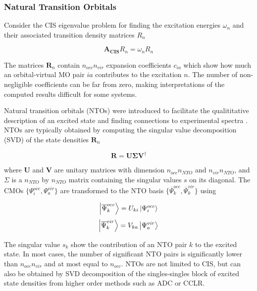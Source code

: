 \subsubsection{Natural Transition Orbitals}

Consider the CIS eigenvalue problem for finding the excitation energies $\omega_n$ and their associated transition density matrices $R_n$

\begin{equation}
\mathbf{A_{CIS}} R_n = \omega_n R_n 
\end{equation}

The matrices $\mathbf{R}_n$ contain $n_{occ}n_{vir}$ expansion coefficients $c_{ia}$ which show how much an orbital-virtual MO pair $ia$ contributes to the excitation $n$. The number of non-negligible coefficients can be far from zero, making interpretations of the computed results difficult for some systems.

Natural transition orbitals (NTOs) were introduced to facilitate the qualititative description of an excited state and finding connections to experimental spectra \cite{Luz1976, Mar2003, Mar2008}. NTOs are typically obtained by computing the singular value decomposition (SVD) of the state densities $\mathbf{R}_n$

\begin{equation}
\mathbf{R} = \mathbf{U} \mathbf{\Sigma} \mathbf{V}^{\dagger}  
\end{equation} 

\noindent where $\mathbf{U}$ and $\mathbf{V}$ are unitary matrices with dimension $n_{occ} n_{NTO}$ and $n_{vir}n_{NTO}$, and $\Sigma$ is a $n_{NTO}$ by $n_{NTO}$ matrix containing the singular values $s$ on its diagonal. The CMOs $\{\Psi^{occ}_i,\Psi^{vir}_a\}$ are transformed to the NTO basis $\{\overline{\Psi}^{occ}_k,\overline{\Psi}^{vir}_k\}$ using

\begin{equation}
\ket{\overline{\Psi}^{occ}_k} = U_{ki} \ket{\Psi^{occ}_i}
\end{equation}
\begin{equation}
\ket{\overline{\Psi}^{vir}_k} = V_{ka} \ket{\Psi^{vir}_a}
\end{equation}

\noindent The singular value $s_k$ show the contribution of an NTO pair $k$ to the excited state. In most cases, the number of significant NTO pairs is significantly lower than $n_{occ}n_{vir}$ and at most equal to $n_{occ}$. NTOs are not limited to CIS, but can also be obtained by SVD decomposition of the singles-singles block of excited state densities from higher order methods such as ADC or CCLR. 

